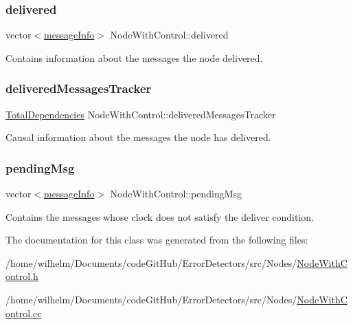 \subsubsection{\texorpdfstring{delivered}{delivered}}
{\footnotesize\ttfamily vector$<$\hyperlink{structures_8h_a7e7bdc1d2fff8a9436f2f352b2711ed6}{message\+Info}$>$ Node\+With\+Control\+::delivered\hspace{0.3cm}{\ttfamily [protected]}}



Contains information about the messages the node delivered. 

\mbox{\label{class_node_with_control_a6c868fa52cca68f650dca96a788475df}} 
\subsubsection{\texorpdfstring{delivered\+Messages\+Tracker}{deliveredMessagesTracker}}
{\footnotesize\ttfamily \hyperlink{class_total_dependencies}{Total\+Dependencies} Node\+With\+Control\+::delivered\+Messages\+Tracker\hspace{0.3cm}{\ttfamily [protected]}}



Causal information about the messages the node has delivered. 

\mbox{\label{class_node_with_control_af38ffbedc82038536c77314f22ea6b57}} 
\subsubsection{\texorpdfstring{pending\+Msg}{pendingMsg}}
{\footnotesize\ttfamily vector$<$\hyperlink{structures_8h_a7e7bdc1d2fff8a9436f2f352b2711ed6}{message\+Info}$>$ Node\+With\+Control\+::pending\+Msg\hspace{0.3cm}{\ttfamily [protected]}}



Contains the messages whose clock does not satisfy the deliver condition. 



The documentation for this class was generated from the following files\+:\begin{DoxyCompactItemize}
\item 
/home/wilhelm/\+Documents/code\+Git\+Hub/\+Error\+Detectors/src/\+Nodes/\hyperlink{_node_with_control_8h}{Node\+With\+Control.\+h}\item 
/home/wilhelm/\+Documents/code\+Git\+Hub/\+Error\+Detectors/src/\+Nodes/\hyperlink{_node_with_control_8cc}{Node\+With\+Control.\+cc}\end{DoxyCompactItemize}
